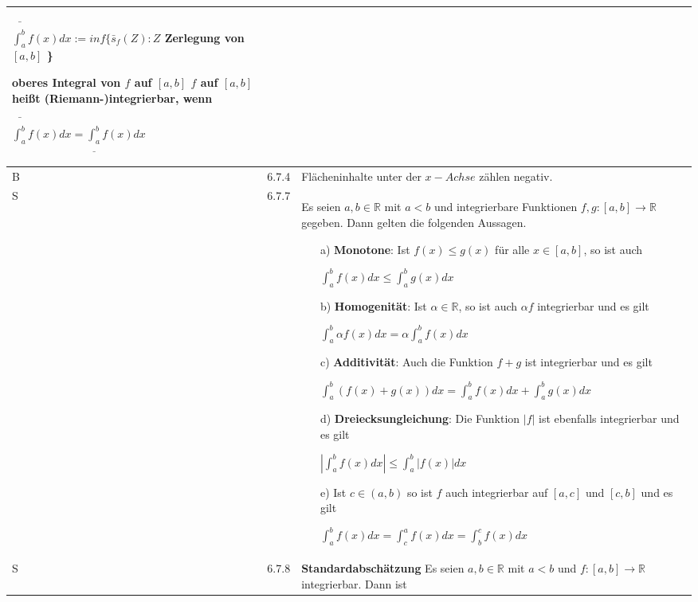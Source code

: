 \begin{longtable}{p{0.75cm} p{1cm} p{16cm}}
                        \centerline{$ \bar{\int^b_a}f(x) dx := inf\{ \bar{s}_f (Z): Z$ Zerlegung von $[a,b]$ \} }
                        \textbf{oberes Integral} von $f$ auf $[a,b]$ \hfill \break
                        $f$ auf $[a,b]$ heißt (Riemann-)integrierbar, wenn \hfill \break
                        \centerline{$\bar{\int^b_a}f(x) dx = \underline{\int_a^b} f(x) dx$}\\
        \midrule
        B   & 6.7.4 &   Flächeninhalte unter der $x-Achse$ zählen negativ. \\
        \midrule
        S   & 6.7.7 &   Es seien $a, b \in \mathbb{R}$ mit $a < b$ und integrierbare Funktionen $f,g: [a,b] \rightarrow \mathbb{R}$ gegeben.
                        Dann gelten die folgenden Aussagen.
                        \begin{itemize}[topsep=-0.5cm]
                            \item[a)] \textbf{Monotone}: Ist $f(x) \leq g(x)$ für alle $x \in [a,b]$, so ist auch \hfill \break
                                        \centerline{$ \int_a^b f(x) dx \leq \int_a^b g(x) dx$}
                            \item[b)] \textbf{Homogenität}: Ist $\alpha \in \mathbb{R}$, so ist auch $\alpha f$ integrierbar und es gilt \hfill \break
                                        \centerline{$ \int_a^b\alpha f(x) dx = \alpha \int_a^bf(x) dx $}
                            \item[c)] \textbf{Additivität}: Auch die Funktion $f+g$ ist integrierbar und es gilt \hfill \break
                                        \centerline{$ \int_a^b (f(x)+g(x))dx= \int_a^bf(x) dx + \int_a^b g(x) dx $}
                            \item[d)] \textbf{Dreiecksungleichung}: Die Funktion $|f|$ ist ebenfalls integrierbar und es gilt \hfill \break
                                        \centerline{$ |\int_a^bf(x)dx| \leq \int_a^b |f(x)| dx $}
                            \item[e)] Ist $c \in (a,b)$ so ist $f$ auch integrierbar auf $[a,c]$ und $[c,b]$ und es gilt \hfill \break
                                        \centerline{$ \int_a^bf(x) dx = \int_c^a f(x) dx = \int_b^c f(x) dx $} 
                        \end{itemize} \vspace{-0cm} \\
        \midrule
        S   & 6.7.8 &   \textbf{Standardabschätzung} \hfill \break
                        Es seien $a,b \in \mathbb{R}$ mit $a < b$ und $f: [a,b] \rightarrow \mathbb{R}$ integrierbar. Dann ist \hfill \break

\end{longtable}

